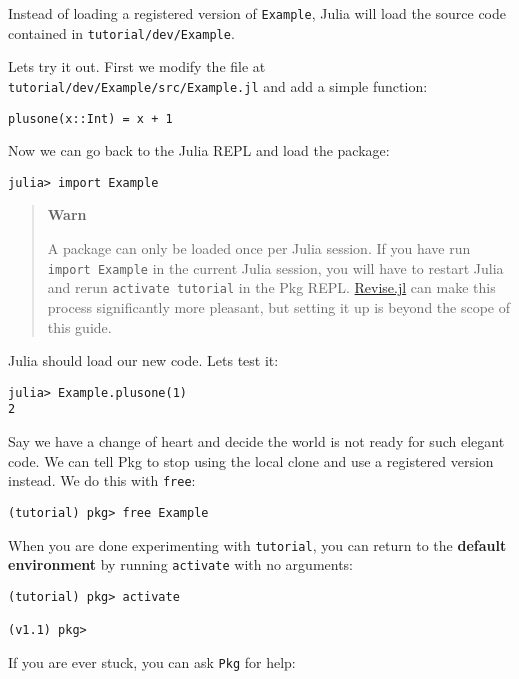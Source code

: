 Instead of loading a registered version of \texttt{Example}, Julia will load the source code contained in \texttt{tutorial/dev/Example}.

Let{\textquotesingle}s try it out. First we modify the file at \texttt{tutorial/dev/Example/src/Example.jl} and add a simple function:


\begin{verbatim}
plusone(x::Int) = x + 1
\end{verbatim}

Now we can go back to the Julia REPL and load the package:


\begin{verbatim}
julia> import Example
\end{verbatim}

\begin{quote}
\textbf{Warn}

A package can only be loaded once per Julia session. If you have run \texttt{import Example} in the current Julia session, you will have to restart Julia and rerun \texttt{activate tutorial} in the Pkg REPL. \href{https://github.com/timholy/Revise.jl/}{Revise.jl} can make this process significantly more pleasant, but setting it up is beyond the scope of this guide.

\end{quote}
Julia should load our new code. Let{\textquotesingle}s test it:


\begin{verbatim}
julia> Example.plusone(1)
2
\end{verbatim}

Say we have a change of heart and decide the world is not ready for such elegant code. We can tell Pkg to stop using the local clone and use a registered version instead. We do this with \texttt{free}:


\begin{verbatim}
(tutorial) pkg> free Example
\end{verbatim}

When you are done experimenting with \texttt{tutorial}, you can return to the \textbf{default environment} by running \texttt{activate} with no arguments:


\begin{verbatim}
(tutorial) pkg> activate

(v1.1) pkg>
\end{verbatim}

If you are ever stuck, you can ask \texttt{Pkg} for help:


